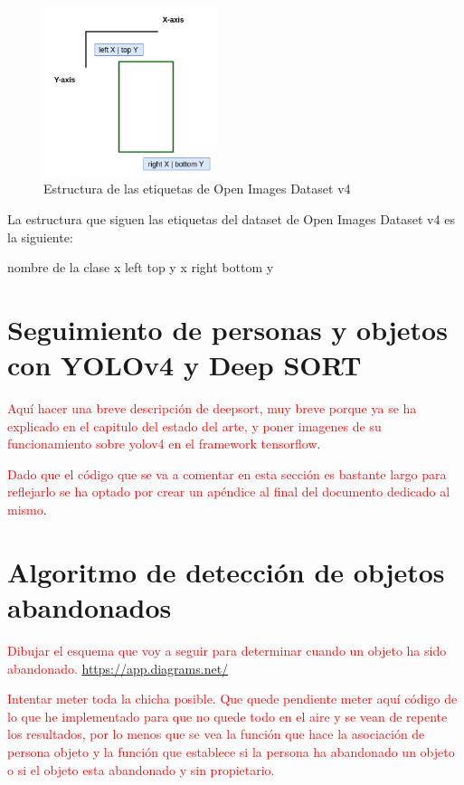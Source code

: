 \begin{figure}[ht]
\centering
\includegraphics[width=0.45\textwidth]{img/chapters/resultados/datasets/bbox-oidv4.png}
\caption{\label{fig:bbox-oidv4}Estructura de las etiquetas de Open Images Dataset v4}
\end{figure}

La estructura que siguen las etiquetas del dataset de Open Images Dataset v4 es la siguiente:

nombre de la clase x left top y x right bottom y

\newpage

\section{Seguimiento de personas y objetos con YOLOv4 y Deep SORT}
\label{sec:desarrollo-yolov4+deepsort}

\textcolor{red}{Aquí hacer una breve descripción de deepsort, muy breve porque ya se ha explicado en el capitulo del estado del arte, y poner imagenes de su funcionamiento sobre yolov4 en el framework tensorflow}.

\textcolor{red}{Dado que el código que se va a comentar en esta sección es bastante largo para reflejarlo se ha optado por crear un apéndice al final del documento dedicado al mismo}.

\newpage

\section{Algoritmo de detección de objetos abandonados}
\label{sec:algoritmo-object-detection}

\textcolor{red}{Dibujar el esquema que voy a seguir para determinar cuando un objeto ha sido abandonado.}
\url{https://app.diagrams.net/}

\textcolor{red}{Intentar meter toda la chicha posible. Que quede pendiente meter aquí código de lo que he implementado para que no quede todo en el aire y se vean de repente los resultados, por lo menos que se vea la función que hace la asociación de persona objeto y la función que establece si la persona ha abandonado un objeto o si el objeto esta abandonado y sin propietario.}

